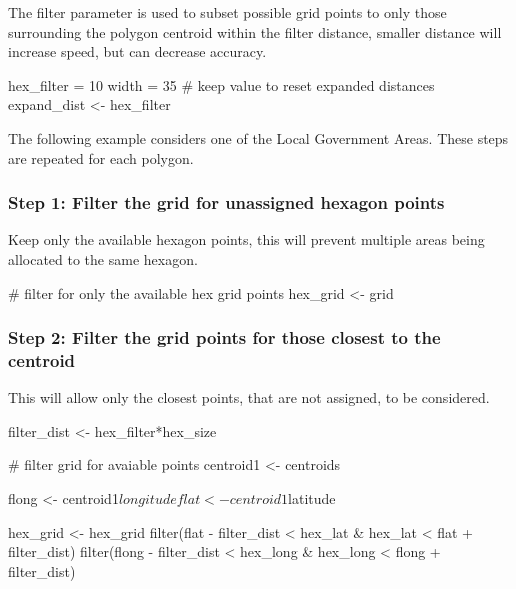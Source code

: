 The filter parameter is used to subset possible grid points to only
those surrounding the polygon centroid within the filter distance,
smaller distance will increase speed, but can decrease accuracy.

\begin{Schunk}
\begin{Sinput}
hex_filter = 10
width = 35
# keep value to reset expanded distances
expand_dist <- hex_filter
\end{Sinput}
\end{Schunk}

The following example considers one of the Local Government Areas. These
steps are repeated for each polygon.

\hypertarget{step-1-filter-the-grid-for-unassigned-hexagon-points}{%
\subsubsection{Step 1: Filter the grid for unassigned hexagon
points}\label{step-1-filter-the-grid-for-unassigned-hexagon-points}}

Keep only the available hexagon points, this will prevent multiple areas
being allocated to the same hexagon.

\begin{Schunk}
\begin{Sinput}
# filter for only the available hex grid points
hex_grid <- grid %
\end{Sinput}
\end{Schunk}

\hypertarget{step-2-filter-the-grid-points-for-those-closest-to-the-centroid}{%
\subsubsection{Step 2: Filter the grid points for those closest to the
centroid}\label{step-2-filter-the-grid-points-for-those-closest-to-the-centroid}}

This will allow only the closest points, that are not assigned, to be
considered.

\begin{Schunk}
\begin{Sinput}
filter_dist <- hex_filter*hex_size

# filter grid for avaiable points
centroid1 <- centroids %

flong <- centroid1$longitude
flat <- centroid1$latitude

hex_grid <- hex_grid %
        filter(flat - filter_dist < hex_lat & hex_lat < flat + filter_dist) %
        filter(flong - filter_dist < hex_long & hex_long < flong + filter_dist)
\end{Sinput}
\end{Schunk}

